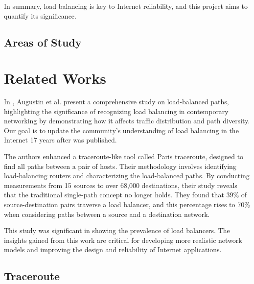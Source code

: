 \documentclass[12pt]{cwru_thesis}
\begin{document}
In summary, load balancing is key to Internet reliability, and this project aims to quantify its significance.



\section{Areas of Study} \label{sec:Areassection}












\chapter{Related Works}

In \cite{Augustin2007}, Augustin et al. present a comprehensive study on load-balanced paths, highlighting the significance of recognizing load balancing in contemporary networking by demonstrating how it affects traffic distribution and path diversity. Our goal is to update the community's understanding of load balancing in the Internet 17 years after \cite{Augustin2007} was published.

The authors enhanced a traceroute-like tool called Paris traceroute, designed to find all paths between a pair of hosts. Their methodology involves identifying load-balancing routers and characterizing the load-balanced paths. By conducting measurements from 15 sources to over 68,000 destinations, their study reveals that the traditional single-path concept no longer holds. They found that 39\% of source-destination pairs traverse a load balancer, and this percentage rises to 70\% when considering paths between a source and a destination network.

This study was significant in showing the prevalence of load balancers. The insights gained from this work are critical for developing more realistic network models and improving the design and reliability of Internet applications.

\section{Traceroute}
\end{document}

